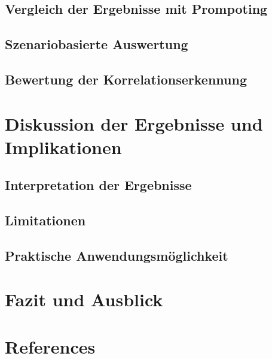 \documentclass[
  11pt,
]{article}
\begin{document}
\subsection{Vergleich der Ergebnisse mit
Prompoting}\label{vergleich-der-ergebnisse-mit-prompoting}

\subsection{Szenariobasierte
Auswertung}\label{szenariobasierte-auswertung}

\subsection{Bewertung der
Korrelationserkennung}\label{bewertung-der-korrelationserkennung}

\section{Diskussion der Ergebnisse und
Implikationen}\label{diskussion-der-ergebnisse-und-implikationen}

\subsection{Interpretation der
Ergebnisse}\label{interpretation-der-ergebnisse}

\subsection{Limitationen}\label{limitationen}

\subsection{Praktische
Anwendungsmöglichkeit}\label{praktische-anwendungsmuxf6glichkeit}

\section{Fazit und Ausblick}\label{fazit-und-ausblick}

\section*{References}\label{references}
\end{document}
